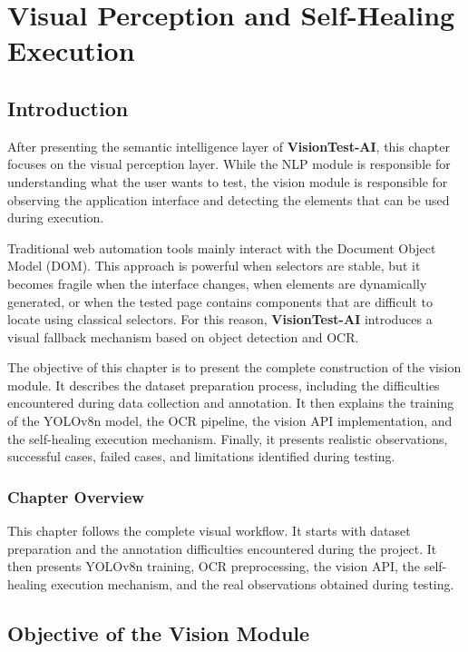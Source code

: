 \chapter{Visual Perception and Self-Healing Execution}
\label{chap:vision_self_healing}
\minitoc
\newpage

\section{Introduction}
\label{sec:ch4_intro}

After presenting the semantic intelligence layer of \textbf{VisionTest-AI}, this chapter focuses on the visual perception layer. While the NLP module is responsible for understanding what the user wants to test, the vision module is responsible for observing the application interface and detecting the elements that can be used during execution.

Traditional web automation tools mainly interact with the Document Object Model (DOM). This approach is powerful when selectors are stable, but it becomes fragile when the interface changes, when elements are dynamically generated, or when the tested page contains components that are difficult to locate using classical selectors. For this reason, \textbf{VisionTest-AI} introduces a visual fallback mechanism based on object detection and OCR.

The objective of this chapter is to present the complete construction of the vision module. It describes the dataset preparation process, including the difficulties encountered during data collection and annotation. It then explains the training of the YOLOv8n model, the OCR pipeline, the vision API implementation, and the self-healing execution mechanism. Finally, it presents realistic observations, successful cases, failed cases, and limitations identified during testing.

\subsection*{Chapter Overview}
{}

This chapter follows the complete visual workflow. It starts with dataset preparation and the annotation difficulties encountered during the project. It then presents YOLOv8n training, OCR preprocessing, the vision API, the self-healing execution mechanism, and the real observations obtained during testing.

\section{Objective of the Vision Module}
\label{sec:vision_objective}

